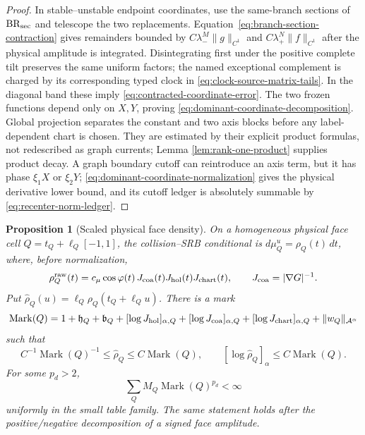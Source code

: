 \documentclass[11pt]{article}
\newtheorem{proposition}[theorem]{Proposition}
\begin{document}
\begin{proof}
In stable--unstable endpoint coordinates, use the same-branch sections of
$\mathrm{BR}_{\rm sec}$ and telescope the two replacements.
Equation~\eqref{eq:branch-section-contraction} gives remainders bounded by
$C\lambda_-^M\|g\|_{C^1}$ and $C\lambda_+^N\|f\|_{C^1}$ after the physical
amplitude is integrated.  Disintegrating first under the positive complete
tilt preserves the same uniform factors; the named exceptional complement is
charged by its corresponding typed clock in
\eqref{eq:clock-source-matrix-tails}.  In the diagonal band these imply
\eqref{eq:contracted-coordinate-error}.  The two frozen functions depend
only on $X,Y$, proving \eqref{eq:dominant-coordinate-decomposition}.  Global
projection separates the constant and two axis blocks before any
label-dependent chart is chosen.  They are estimated by their explicit
product formulas, not redescribed as graph currents; Lemma
\ref{lem:rank-one-product} supplies product decay.  A graph boundary
cutoff can reintroduce an axis term, but it has phase $\xi_1X$ or $\xi_2Y$;
\eqref{eq:dominant-coordinate-normalization} gives the physical derivative
lower bound, and its cutoff ledger is absolutely summable by
\eqref{eq:recenter-norm-ledger}.
\end{proof}

\begin{proposition}[Scaled physical face density]
\label{prop:scaled-face-density}
On a homogeneous physical face cell
\(Q=t_Q+\ell_Q[-1,1]\), the collision--SRB conditional is
\(d\mu_Q^u=\rho_Q(t)\,dt\), where, before normalization,
\begin{equation}
\label{eq:face-conditional-density}
 \rho_Q^{\rm raw}(t)=c_\mu\cos\varphi(t)\,J_{\rm coa}(t)
 J_{\rm hol}(t)J_{\rm chart}(t),
 \qquad J_{\rm coa}=|\nabla G|^{-1}.
\end{equation}
Put
\(\widehat\rho_Q(u)=\ell_Q\rho_Q(t_Q+\ell_Qu)\).  There is a mark
\begin{equation}
\label{eq:density-mark-definition}
 \operatorname{Mark}(Q)=
 1+\mathfrak h_Q+\mathfrak b_Q+
 [\log J_{\rm hol}]_{\alpha,Q}
 +[\log J_{\rm coa}]_{\alpha,Q}
 +[\log J_{\rm chart}]_{\alpha,Q}
 +\|w_Q\|_{\mathcal A^\alpha}
\end{equation}
such that
\begin{equation}
\label{eq:scaled-density-bound}
 C^{-1}\operatorname{Mark}(Q)^{-1}
 \le\widehat\rho_Q\le C\operatorname{Mark}(Q),\qquad
 [\log\widehat\rho_Q]_\alpha
 \le C\operatorname{Mark}(Q).
\end{equation}
For some \(p_d>2\),
\begin{equation}
\label{eq:density-mark-moment}
 \sum_Q M_Q\operatorname{Mark}(Q)^{p_d}<\infty
\end{equation}
uniformly in the small table family.  The same statement holds after the
positive/negative decomposition of a signed face amplitude.
\end{proposition}
\end{document}
